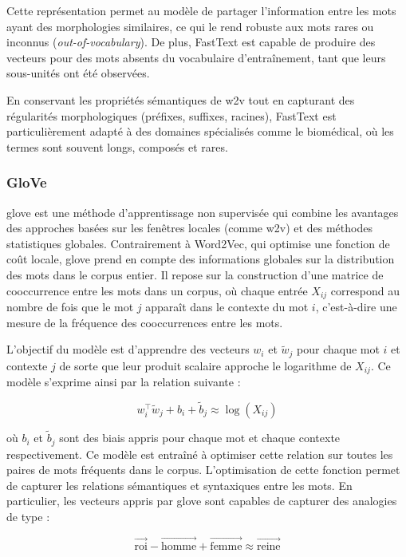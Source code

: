 \documentclass[12pt]{report}
\begin{document}
Cette représentation permet au modèle de partager l'information entre les mots ayant des morphologies similaires, ce qui le rend robuste aux mots rares ou inconnus (\textit{out-of-vocabulary}). De plus, FastText est capable de produire des vecteurs pour des mots absents du vocabulaire d’entraînement, tant que leurs sous-unités ont été observées.

En conservant les propriétés sémantiques de \gls{w2v} tout en capturant des régularités morphologiques (préfixes, suffixes, racines), FastText est particulièrement adapté à des domaines spécialisés comme le biomédical, où les termes sont souvent longs, composés et rares.

\subsubsection{GloVe}

\gls{glove} \cite{pennington2014glove} est une méthode d'apprentissage non supervisée qui combine les avantages des approches basées sur les fenêtres locales (comme \gls{w2v}) et des méthodes statistiques globales. Contrairement à Word2Vec, qui optimise une fonction de coût locale, \gls{glove} prend en compte des informations globales sur la distribution des mots dans le corpus entier. Il repose sur la construction d'une matrice de cooccurrence entre les mots dans un corpus, où chaque entrée \( X_{ij} \) correspond au nombre de fois que le mot \( j \) apparaît dans le contexte du mot \( i \), c'est-à-dire une mesure de la fréquence des cooccurrences entre les mots.

L’objectif du modèle est d’apprendre des vecteurs \( w_i \) et \( \tilde{w}_j \) pour chaque mot \( i \) et contexte \( j \) de sorte que leur produit scalaire approche le logarithme de \( X_{ij} \). Ce modèle s'exprime ainsi par la relation suivante :

\[
w_i^\top \tilde{w}_j + b_i + \tilde{b}_j \approx \log(X_{ij})
\]

où \( b_i \) et \( \tilde{b}_j \) sont des biais appris pour chaque mot et chaque contexte respectivement. Ce modèle est entraîné à optimiser cette relation sur toutes les paires de mots fréquents dans le corpus. L'optimisation de cette fonction permet de capturer les relations sémantiques et syntaxiques entre les mots. En particulier, les vecteurs appris par \gls{glove} sont capables de capturer des analogies de type :

\[
\vec{\text{roi}} - \vec{\text{homme}} + \vec{\text{femme}} \approx \vec{\text{reine}}
\]
\end{document}
